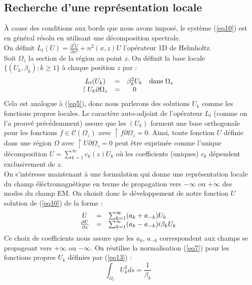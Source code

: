 \documentclass{article}
\begin{document}
\subsection{Recherche d'une représentation locale}
À cause des conditions aux bords que nous avons imposé, le système (\ref{eq10}) est en général résolu en utilisant une décomposition spectrale.\\
On définit $L_t(U)=\frac{\partial^2U}{\partial x^2}+n^2(x,z)U$ l'opérateur 1D de Helmholtz.\\
Soit $\Omega_z$ la section de la région au point $z$. On définit la base locale $\{(U_k,\beta_k);k\geq 1\}$ à chaque position $z$ par : 
\begin{equation} \label{eq13}
	\begin{array}{c c c c}
		L_t(U_k)&=&\beta_k^2U_k &\text{dans } \Omega_z\\
		\restriction{U_k}{\partial\Omega_z}&=&0
	\end{array}
\end{equation}
Cela est analogue à (\ref{eq5}), donc nous parlerons des solutions $U_k$ comme les fonctions propres locales. Le caractère auto-adjoint de l'opérateur $L_t$ (comme on l'a prouvé précédemment) assure que les $(U_k)$ forment une base orthogonale pour les fonctions $f\in\mathscr{C}(\Omega_z)$ avec $\restriction{f}{\partial\Omega_z}=0$. Ainsi, toute fonction $U$ définie dans une région $\Omega$ avec $\restriction{U}{\partial\Omega_z}=0$ peut être exprimée comme l'unique décomposition $U=\sum_{k=1}^\infty c_k(z)U_k$ où les coefficients (uniques) $c_k$ dépendent exclusivement de $z$.\\
On s'intéresse maintenant à une formulation qui donne une représentation locale du champ éléctromagnétique en terme de propagation vers $-\infty$ ou $+\infty$ des modes du champ EM.
On choisit donc le développement de notre fonction $U$ solution de (\ref{eq10}) de la forme :
\begin{equation}\label{eq14}
\begin{array}{c c l}
U&=&\sum_{k=1}^\infty (a_k+a_{-k})U_k\\
\frac{\partial U}{\partial z}&=&\sum_{k=1}^\infty (a_k-a_{-k})i\beta_kU_k
\end{array}
\end{equation}
Ce choix de coefficients nous assure que les $a_k$, $a_{-k}$ correspondent aux champs se propageant vers $+\infty$ ou $-\infty$. On réutilise la normalisation (\ref{eq7}) pour les fonctions propres $U_k$ définies par (\ref{eq13}) :
\begin{equation}\label{eq15}
	\int_{\Omega_z} U_k^2ds=\frac{1}{\beta_k}
\end{equation}
\end{document}
